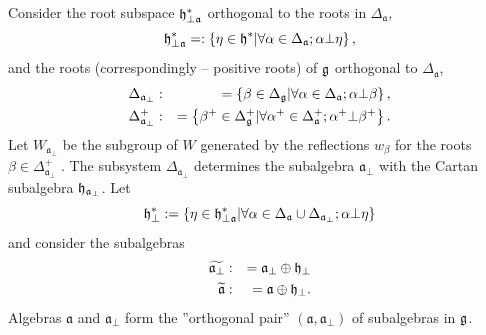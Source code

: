 \documentclass[12pt]{iopart}
\theoremstyle{definition}
\newcommand{\af}{\mathfrak{a}}
\begin{document}
Consider the root subspace
$\frak{h}_{\perp \af}^{\ast }$ orthogonal to the roots in $\Delta _{\af}$,
\begin{equation*}
\frak{h}_{\perp \af}^{\ast }=:\left\{ \eta \in \frak{h}^{\ast }
|\forall \alpha \in \Delta _{\af};\alpha \bot \eta \right\} ,
\end{equation*}
and the roots (correspondingly -- positive roots) of $\frak{g}$ orthogonal
to $\Delta _{\af}$,
\begin{eqnarray*}
\Delta _{\af_{\perp }} &:&=\left\{ \beta \in \Delta _{\frak{g}}|\forall
\alpha \in \Delta _{\af};\alpha \bot \beta \right\} , \\
\Delta _{\af_{\perp }}^{+} &:&=\left\{ \beta ^{+}\in \Delta _{\frak{g}%
}^{+}|\forall \alpha ^{+}\in \Delta _{\af}^{+};\alpha ^{+}\bot \beta
^{+}\right\} .
\end{eqnarray*}
Let $W_{\af_{\perp }}$ be the subgroup of $W$ generated by the
reflections $w _{\beta }$ for the roots $\beta \in \Delta _{\af%
_{\perp }}^{+}$ . The subsystem $\Delta _{\af_{\perp }}$ determines the
subalgebra $\af_{\perp }$ with the Cartan subalgebra $\frak{h}_{\af%
_{\perp }}$. Let
\begin{equation*}
\frak{h}_{\perp }^{\ast }:=\left\{ \eta \in \frak{h}_{\perp \af}^{\ast
}|\forall \alpha \in \Delta _{\af}\cup \Delta _{\af_{\perp
}};\alpha \bot \eta \right\}
\end{equation*}
and consider the subalgebras
\begin{eqnarray*}
\widetilde{\af_{\perp }} &:&=\af_{\perp }\oplus \frak{h}_{\perp }
\\
\widetilde{\af} &:&=\af\oplus \frak{h}_{\perp }.
\end{eqnarray*}
Algebras $\af$ and $\af_{\perp }$ form the ''orthogonal pair''
$\left( \af,\af_{\perp}\right) $
of subalgebras in $\frak{g}$.
\end{document}
